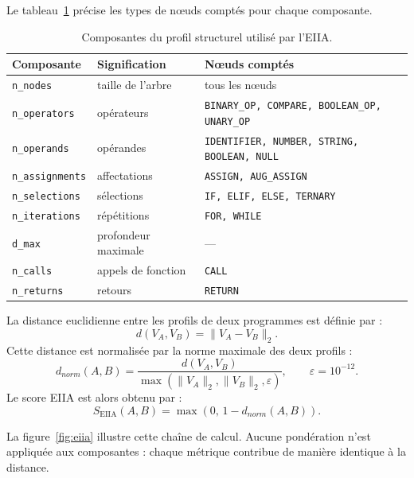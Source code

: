 {Le tableau~\ref{tab:eiia} précise les types de nœuds comptés pour chaque
composante.

\begin{table}[htbp]
\centering
\small
\begin{tabular}{lll}
\toprule
\textbf{Composante} & \textbf{Signification} & \textbf{Nœuds comptés} \\
\midrule
\texttt{n\_nodes} & taille de l'arbre & tous les nœuds \\
\texttt{n\_operators} & opérateurs & \texttt{BINARY\_OP, COMPARE, BOOLEAN\_OP, UNARY\_OP} \\
\texttt{n\_operands} & opérandes & \texttt{IDENTIFIER, NUMBER, STRING, BOOLEAN, NULL} \\
\texttt{n\_assignments} & affectations & \texttt{ASSIGN, AUG\_ASSIGN} \\
\texttt{n\_selections} & sélections & \texttt{IF, ELIF, ELSE, TERNARY} \\
\texttt{n\_iterations} & répétitions & \texttt{FOR, WHILE} \\
\texttt{d\_max} & profondeur maximale & --- \\
\texttt{n\_calls} & appels de fonction & \texttt{CALL} \\
\texttt{n\_returns} & retours & \texttt{RETURN} \\
\bottomrule
\end{tabular}
\caption{Composantes du profil structurel utilisé par l'EIIA.}
\label{tab:eiia}
\end{table}

La distance euclidienne entre les profils de deux programmes est définie par :
\begin{equation}
d(V_A,V_B) = \lVert V_A - V_B \rVert_2 .
\end{equation}
Cette distance est normalisée par la norme maximale des deux profils :
\begin{equation}
d_{norm}(A,B) = \frac{d(V_A,V_B)}{\max\left(\lVert V_A\rVert_2,
\lVert V_B\rVert_2, \varepsilon\right)}, \qquad \varepsilon = 10^{-12}.
\end{equation}
Le score EIIA est alors obtenu par :
\begin{equation}
S_{\mathrm{EIIA}}(A,B) = \max\left(0,\, 1 - d_{norm}(A,B)\right).
\end{equation}

La figure~\ref{fig:eiia} illustre cette chaîne de calcul. Aucune pondération
n'est appliquée aux composantes : chaque métrique contribue de manière
identique à la distance.

}
